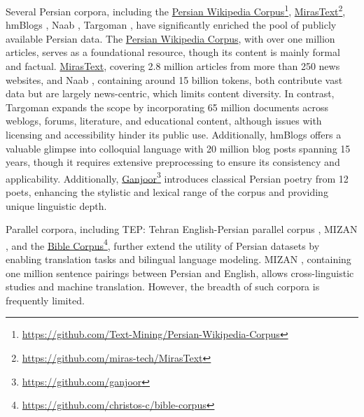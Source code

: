 Several Persian corpora, including the \href{https://github.com/Text-Mining/Persian-Wikipedia-Corpus}{Persian Wikipedia Corpus}\footnote{\href{https://github.com/Text-Mining/Persian-Wikipedia-Corpus}{https://github.com/Text-Mining/Persian-Wikipedia-Corpus}}, \href{https://github.com/miras-tech/MirasText}{MirasText}\footnote{\href{https://github.com/miras-tech/MirasText}{https://github.com/miras-tech/MirasText}}, hmBlogs \citep{khansari2021hmblogsbiggeneralpersian}, Naab \citep{naab}, Targoman \citep{targoman}, have significantly enriched the pool of publicly available Persian data. The \href{https://github.com/Text-Mining/Persian-Wikipedia-Corpus}{Persian Wikipedia Corpus}, with over one million articles, serves as a foundational resource, though its content is mainly formal and factual. \href{https://github.com/miras-tech/MirasText}{MirasText}, covering 2.8 million articles from more than 250 news websites, and Naab \citep{naab}, containing around 15 billion tokens, both contribute vast data but are largely news-centric, which limits content diversity. In contrast, Targoman \citep{targoman} expands the scope by incorporating 65 million documents across weblogs, forums, literature, and educational content, although issues with licensing and accessibility hinder its public use. Additionally, hmBlogs \citep{khansari2021hmblogsbiggeneralpersian} offers a valuable glimpse into colloquial language with 20 million blog posts spanning 15 years, though it requires extensive preprocessing to ensure its consistency and applicability. Additionally, \href{https://github.com/ganjoor}{Ganjoor}\footnote{\href{https://github.com/ganjoor}{https://github.com/ganjoor}} introduces classical Persian poetry from 12 poets, enhancing the stylistic and lexical range of the corpus and providing unique linguistic depth.

Parallel corpora, including TEP: Tehran English-Persian parallel corpus \citep{tiedemann-2012-parallel}, MIZAN \citep{kashefi2020mizanlargepersianenglishparallel}, and the \href{https://github.com/christos-c/bible-corpus}{Bible Corpus}\footnote{\href{https://github.com/christos-c/bible-corpus}{https://github.com/christos-c/bible-corpus}}, further extend the utility of Persian datasets by enabling translation tasks and bilingual language modeling. MIZAN \citep{kashefi2020mizanlargepersianenglishparallel}, containing one million sentence pairings between Persian and English, allows cross-linguistic studies and machine translation. However, the breadth of such corpora is frequently limited.


